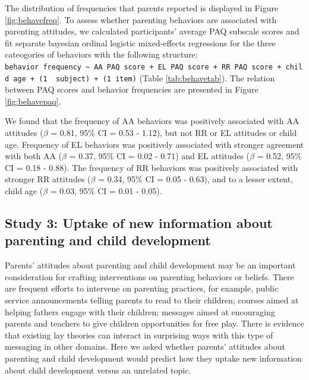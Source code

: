 \documentclass[man]{apa6}
\theoremstyle{definition}
\theoremstyle{definition}
\theoremstyle{definition}
\theoremstyle{remark}
\begin{document}
The distribution of frequencies that parents reported is displayed in
Figure \ref{fig:behavefreq}. To assess whether parenting behaviors are
associated with parenting attitudes, we calculated participants' average
PAQ subscale scores and fit separate bayesian ordinal logistic
mixed-effects regressions for the three cateogories of behaviors with
the following structure:
\texttt{behavior\ frequency\ \textasciitilde{}\ AA\ PAQ\ score\ +\ EL\ PAQ\ score\ +\ RR\ PAQ\ score\ +\ child\ age\ +\ (1\ \textbar{}\ subject)\ +\ (1\textbar{}\ item)}
(Table \ref{tab:behavetab}). The relation between PAQ scores and
behavior frequencies are presented in Figure \ref{fig:behavepaq}.

We found that the frequency of AA behaviors was positively associated
with AA attitudes (\(\beta\) = 0.81, 95\% CI = 0.53 - 1.12), but not RR
or EL attitudes or child age. Frequency of EL behaviors was positively
associated with stronger agreement with both AA (\(\beta\) = 0.37, 95\%
CI = 0.02 - 0.71) and EL attitudes (\(\beta\) = 0.52, 95\% CI = 0.18 -
0.88). The frequency of RR behaviors was positively associated with
stronger RR attitudes (\(\beta\) = 0.34, 95\% CI = 0.05 - 0.63), and to
a lesser extent, child age (\(\beta\) = 0.03, 95\% CI = 0.01 - 0.05).

\subsection{Study 3: Uptake of new information about parenting and child
development}\label{study-3-uptake-of-new-information-about-parenting-and-child-development}

Parents' attitudes about parenting and child development may be an
important consideration for crafting interventions on parenting
behaviors or beliefs. There are frequent efforts to intervene on
parenting practices, for example, public service announcements telling
parents to read to their children; courses aimed at helping fathers
engage with their children; messages aimed at encouraging parents and
teachers to give children opportunities for free play. There is evidence
that existing lay theories can interact in surprising ways with this
type of messaging in other domains. Here we asked whether parents'
attitudes about parenting and child development would predict how they
uptake new information about child development versus an unrelated
topic.
\end{document}
